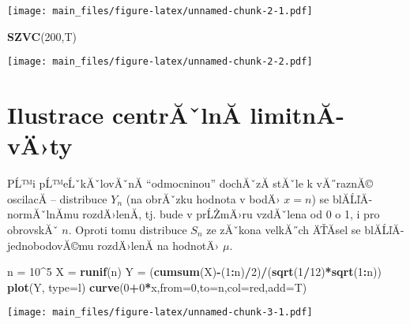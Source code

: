 \documentclass[
]{article}
\newenvironment{Shaded}{\begin{snugshade}}{\end{snugshade}}
\newcommand{\AttributeTok}[1]{\textcolor[rgb]{0.13,0.29,0.53}{#1}}
\newcommand{\DecValTok}[1]{\textcolor[rgb]{0.00,0.00,0.81}{#1}}
\newcommand{\FunctionTok}[1]{\textcolor[rgb]{0.13,0.29,0.53}{\textbf{#1}}}
\newcommand{\NormalTok}[1]{#1}
\newcommand{\OtherTok}[1]{\textcolor[rgb]{0.56,0.35,0.01}{#1}}
\newcommand{\SpecialCharTok}[1]{\textcolor[rgb]{0.81,0.36,0.00}{\textbf{#1}}}
\newcommand{\StringTok}[1]{\textcolor[rgb]{0.31,0.60,0.02}{#1}}
\begin{document}
\texttt{[image: main\_files/figure-latex/unnamed-chunk-2-1.pdf]}

\begin{Shaded}
\begin{Highlighting}[]
\FunctionTok{SZVC}\NormalTok{(}\DecValTok{200}\NormalTok{,T)}
\end{Highlighting}
\end{Shaded}

\texttt{[image: main\_files/figure-latex/unnamed-chunk-2-2.pdf]}

\hypertarget{ilustrace-centrux103ux2c7lnux103-limitnux103-vuxe4ty}{%
\section{Ilustrace centrĂˇlnĂ­ limitnĂ­
vÄ›ty}\label{ilustrace-centrux103ux2c7lnux103-limitnux103-vuxe4ty}}

PĹ™i pĹ™eĹˇkĂˇlovĂˇnĂ­ ``odmocninou'' dochĂˇzĂ­ stĂˇle k vĂ˝raznĂ©
oscilacĂ­ -- distribuce \(Y_n\) (na obrĂˇzku hodnota v bodÄ› \(x=n\)) se
blĂ­ĹľĂ­ normĂˇlnĂ­mu rozdÄ›lenĂ­, tj. bude v prĹŻmÄ›ru vzdĂˇlena od 0 o 1,
i pro obrovskĂˇ \(n\). Oproti tomu distribuce \(S_n\) ze zĂˇkona
velkĂ˝ch ÄŤĂ­sel se blĂ­ĹľĂ­ jednobodovĂ©mu rozdÄ›lenĂ­ na hodnotÄ› \(\mu\).

\begin{Shaded}
\begin{Highlighting}[]
\NormalTok{n }\OtherTok{=} \DecValTok{10}\SpecialCharTok{\^{}}\DecValTok{5}
\NormalTok{X }\OtherTok{=} \FunctionTok{runif}\NormalTok{(n)}
\NormalTok{Y }\OtherTok{=}\NormalTok{ (}\FunctionTok{cumsum}\NormalTok{(X)}\SpecialCharTok{{-}}\NormalTok{(}\DecValTok{1}\SpecialCharTok{:}\NormalTok{n)}\SpecialCharTok{/}\DecValTok{2}\NormalTok{)}\SpecialCharTok{/}\NormalTok{(}\FunctionTok{sqrt}\NormalTok{(}\DecValTok{1}\SpecialCharTok{/}\DecValTok{12}\NormalTok{)}\SpecialCharTok{*}\FunctionTok{sqrt}\NormalTok{(}\DecValTok{1}\SpecialCharTok{:}\NormalTok{n))}
\FunctionTok{plot}\NormalTok{(Y, }\AttributeTok{type=}\StringTok{\textquotesingle{}l\textquotesingle{}}\NormalTok{)}
\FunctionTok{curve}\NormalTok{(}\DecValTok{0}\SpecialCharTok{+}\DecValTok{0}\SpecialCharTok{*}\NormalTok{x,}\AttributeTok{from=}\DecValTok{0}\NormalTok{,}\AttributeTok{to=}\NormalTok{n,}\AttributeTok{col=}\StringTok{\textquotesingle{}red\textquotesingle{}}\NormalTok{,}\AttributeTok{add=}\NormalTok{T)}
\end{Highlighting}
\end{Shaded}

\texttt{[image: main\_files/figure-latex/unnamed-chunk-3-1.pdf]}
\end{document}
